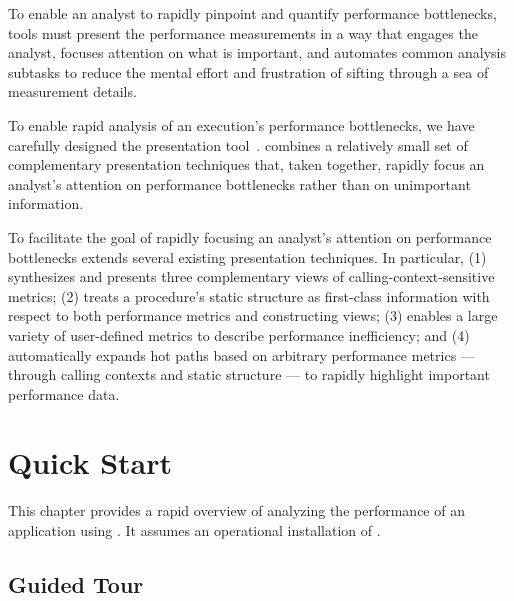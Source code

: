 \documentclass[11pt,letterpaper]{report}
\begin{document}
To enable an analyst to rapidly pinpoint and quantify performance bottlenecks, tools must present the performance measurements in a way that engages the analyst, focuses attention on what is important, and automates common analysis subtasks to reduce the mental effort and frustration of sifting through a sea of measurement details.

To enable rapid analysis of an execution's performance bottlenecks, we have carefully designed the \hpcviewer{} presentation tool~\cite{Adhianto-MC-Ta:2010:PSTI-hpcviewer}.
\hpcviewer{} combines a relatively small set of complementary presentation techniques that, taken together, rapidly focus an analyst's attention on performance bottlenecks rather than on unimportant information.

To facilitate the goal of rapidly focusing an analyst's attention on performance bottlenecks \hpcviewer{} extends several existing presentation techniques.
In particular, \hpcviewer{} (1) synthesizes and presents three complementary views of calling-context-sensitive metrics; (2) treats a procedure's static structure as first-class information with respect to both performance metrics and constructing views; (3) enables a large variety of user-defined metrics to describe performance inefficiency; and (4) automatically expands hot paths based on arbitrary performance metrics --- through calling contexts and static structure --- to rapidly highlight important performance data.




\chapter{Quick Start}
\label{chpt:quickstart}

This chapter provides a rapid overview of analyzing the performance of an application using \HPCToolkit{}.
It assumes an operational installation of \HPCToolkit{}.



\section{Guided Tour}
\label{chpt:quickstart:tour}
\end{document}

